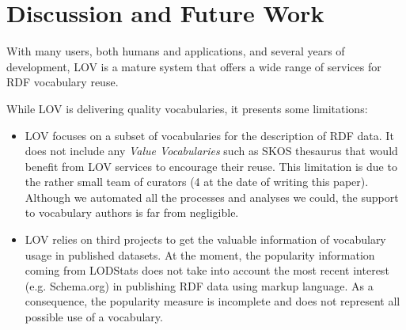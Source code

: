 \documentclass{iosart2c}
\begin{document}
\section{Discussion and Future Work}\label{sec:discussion}



With many users, both humans and applications, and several years of development, LOV is a mature system that offers a wide range of services for RDF vocabulary reuse. 

While LOV is delivering quality vocabularies, it presents some limitations:

\begin{itemize}
 \item LOV focuses on a subset of vocabularies for the description of RDF data. It does not include any \emph{Value Vocabularies} such as SKOS thesaurus that would benefit from LOV services to encourage their reuse. This limitation is due to the rather small team of curators (4 at the date of writing this paper). Although we automated all the processes and analyses we could, the support to vocabulary authors is far from negligible. 

\item LOV relies on third projects to get the valuable information of vocabulary usage in published datasets. At the moment, the popularity information coming from LODStats does not take into account the most recent interest (e.g. Schema.org) in publishing RDF data using markup language. As a consequence, the popularity measure is incomplete and does not represent all possible use of a vocabulary. 

\end{itemize}
\end{document}

